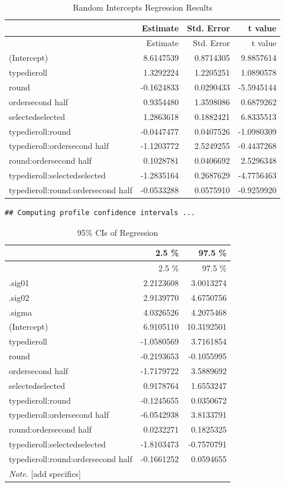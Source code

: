 \documentclass[man]{apa6}
\newenvironment{Shaded}{\begin{snugshade}}{\end{snugshade}}
\newcommand{\DataTypeTok}[1]{\textcolor[rgb]{0.13,0.29,0.53}{#1}}
\newcommand{\KeywordTok}[1]{\textcolor[rgb]{0.13,0.29,0.53}{\textbf{#1}}}
\newcommand{\NormalTok}[1]{#1}
\newcommand{\StringTok}[1]{\textcolor[rgb]{0.31,0.60,0.02}{#1}}
\begin{document}
\begin{longtable}[]{@{}lrrr@{}}
\caption{Random Intercepts Regression Results}\tabularnewline
\toprule
& Estimate & Std. Error & t value\tabularnewline
\midrule
\endfirsthead
\toprule
& Estimate & Std. Error & t value\tabularnewline
\midrule
\endhead
(Intercept) & 8.6147539 & 0.8714305 & 9.8857614\tabularnewline
typedieroll & 1.3292224 & 1.2205251 & 1.0890578\tabularnewline
round & -0.1624833 & 0.0290433 & -5.5945144\tabularnewline
ordersecond half & 0.9354480 & 1.3598086 & 0.6879262\tabularnewline
selectedselected & 1.2863618 & 0.1882421 & 6.8335513\tabularnewline
typedieroll:round & -0.0447477 & 0.0407526 & -1.0980309\tabularnewline
typedieroll:ordersecond half & -1.1203772 & 2.5249255 &
-0.4437268\tabularnewline
round:ordersecond half & 0.1028781 & 0.0406692 &
2.5296348\tabularnewline
typedieroll:selectedselected & -1.2835164 & 0.2687629 &
-4.7756463\tabularnewline
typedieroll:round:ordersecond half & -0.0533288 & 0.0575910 &
-0.9259920\tabularnewline
\bottomrule
\end{longtable}

\begin{Shaded}
\end{Shaded}

\begin{verbatim}
## Computing profile confidence intervals ...
\end{verbatim}

\begin{longtable}[]{@{}lrr@{}}
\caption{95\% CIs of Regression}\tabularnewline
\toprule
& 2.5 \% & 97.5 \%\tabularnewline
\midrule
\endfirsthead
\toprule
& 2.5 \% & 97.5 \%\tabularnewline
\midrule
\endhead
.sig01 & 2.2123608 & 3.0013274\tabularnewline
.sig02 & 2.9139770 & 4.6750756\tabularnewline
.sigma & 4.0326526 & 4.2075468\tabularnewline
(Intercept) & 6.9105110 & 10.3192501\tabularnewline
typedieroll & -1.0580569 & 3.7161854\tabularnewline
round & -0.2193653 & -0.1055995\tabularnewline
ordersecond half & -1.7179722 & 3.5889692\tabularnewline
selectedselected & 0.9178764 & 1.6553247\tabularnewline
typedieroll:round & -0.1245655 & 0.0350672\tabularnewline
typedieroll:ordersecond half & -6.0542938 & 3.8133791\tabularnewline
round:ordersecond half & 0.0232271 & 0.1825325\tabularnewline
typedieroll:selectedselected & -1.8103473 & -0.7570791\tabularnewline
typedieroll:round:ordersecond half & -0.1661252 &
0.0594655\tabularnewline
\emph{Note}. {[}add specifics{]} & &\tabularnewline
\bottomrule
\end{longtable}
\end{document}
